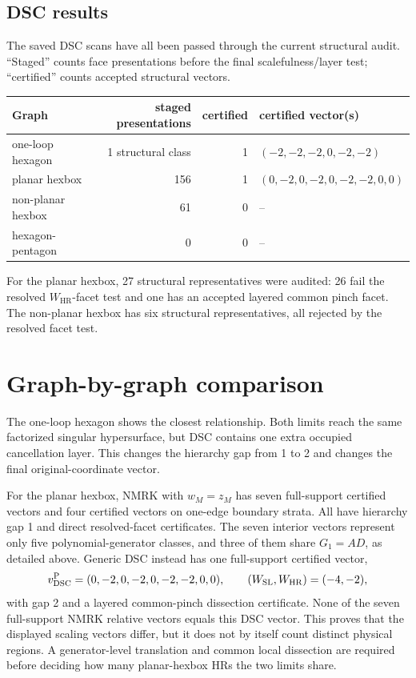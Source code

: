 \documentclass[11pt]{article}
\newcommand{\SL}{\mathrm{SL}}
\newcommand{\HR}{\mathrm{HR}}
\begin{document}
\subsection{DSC results}

The saved DSC scans have all been passed through the current structural
audit.  ``Staged'' counts face presentations before the final
scalefulness/layer test; ``certified'' counts accepted structural vectors.

\begin{center}
\begin{tabular}{@{}lrrl@{}}
\toprule
Graph & staged presentations & certified & certified vector(s)\\
\midrule
one-loop hexagon & 1 structural class & 1 & \((-2,-2,-2,0,-2,-2)\)\\
planar hexbox & 156 & 1 & \((0,-2,0,-2,0,-2,-2,0,0)\)\\
non-planar hexbox & 61 & 0 & --\\
hexagon-pentagon & 0 & 0 & --\\
\bottomrule
\end{tabular}
\end{center}
For the planar hexbox, 27 structural representatives were audited: 26 fail
the resolved \(W_{\HR}\)-facet test and one has an accepted layered common
pinch facet.  The non-planar hexbox has six structural representatives, all
rejected by the resolved facet test.

\section{Graph-by-graph comparison}

The one-loop hexagon shows the closest relationship.  Both limits reach the
same factorized singular hypersurface, but DSC contains one extra occupied
cancellation layer.  This changes the hierarchy gap from 1 to 2 and changes
the final original-coordinate vector.

For the planar hexbox, NMRK with \(w_M=z_M\) has seven full-support certified
vectors and four certified vectors on one-edge boundary strata.  All have
hierarchy gap 1 and direct resolved-facet certificates.  The seven interior
vectors represent only five polynomial-generator classes, and three of them
share \(G_1=AD\), as detailed above.  Generic DSC instead has one
full-support certified vector,
\begin{equation}
v_{\rm DSC}^{\rm P}=(0,-2,0,-2,0,-2,-2,0,0),\qquad
(W_{\SL},W_{\HR})=(-4,-2),
\end{equation}
with gap 2 and a layered common-pinch dissection certificate.  None of the
seven full-support NMRK relative vectors equals this DSC vector.  This proves
that the displayed scaling vectors differ, but it does not by itself count
distinct physical regions.  A generator-level translation and common local
dissection are required before deciding how many planar-hexbox HRs the two
limits share.
\end{document}
